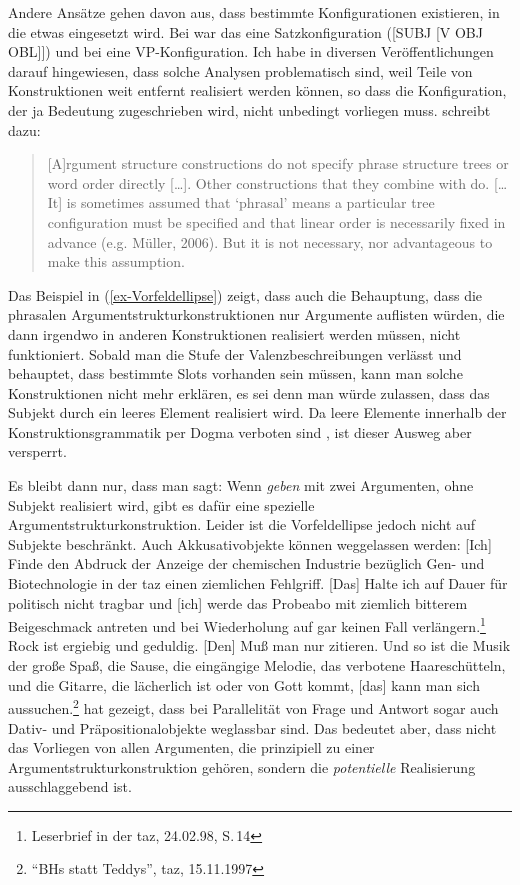Andere Ansätze gehen davon aus, dass bestimmte Konfigurationen existieren, in die etwas eingesetzt
wird. Bei \citet[192]{Goldberg95a} war das eine Satzkonfiguration ([SUBJ [V OBJ OBL]]) und bei \citet[534]{GJ2004a} eine
VP-Konfiguration. Ich habe in diversen Veröffentlichungen darauf hingewiesen, dass solche Analysen
problematisch sind, weil Teile von Konstruktionen weit entfernt realisiert werden können, so dass
die Konfiguration, der ja Bedeutung zugeschrieben wird, nicht unbedingt vorliegen muss. \citet[453]{Goldberg2013a}
schreibt dazu:
\begin{quote}
[A]rgument structure constructions do not specify phrase structure trees or word order
directly [\ldots]. Other constructions that they combine with do. [\ldots{} It] is sometimes assumed that
`phrasal' means a particular tree configuration must be specified and that linear order is
necessarily fixed in advance (e.g. Müller, 2006). But it is not necessary, nor advantageous to make this
assumption. \citep[453]{Goldberg2013a}
\end{quote}
Das Beispiel in (\ref{ex-Vorfeldellipse}) zeigt, dass auch die Behauptung, dass die phrasalen
Argumentstrukturkonstruktionen nur Argumente auflisten würden, die dann irgendwo
in anderen Konstruktionen realisiert werden müssen, nicht funktioniert. Sobald man die Stufe der
Valenzbeschreibungen verlässt und behauptet, dass bestimmte Slots vorhanden sein müssen, kann man
solche Konstruktionen nicht mehr erklären, es sei denn man würde zulassen, dass das Subjekt durch
ein leeres Element realisiert wird. Da leere Elemente innerhalb der Konstruktionsgrammatik per Dogma
verboten sind \citep[]{Goldberg2003b}, ist dieser Ausweg aber versperrt.

Es bleibt dann nur, dass man sagt: Wenn \emph{geben} mit zwei Argumenten, \dash ohne Subjekt
realisiert wird, gibt es dafür eine spezielle Argumentstrukturkonstruktion. Leider ist die
Vorfeldellipse jedoch nicht auf Subjekte beschränkt. Auch Akkusativobjekte können weggelassen werden:
\eal
\ex {}[Ich] Finde den Abdruck der Anzeige der chemischen Industrie bezüglich Gen- und Biotechnologie 
      in der taz einen ziemlichen Fehlgriff. [Das] Halte ich auf Dauer für politisch nicht tragbar 
      und [ich] werde das Probeabo mit ziemlich bitterem Beigeschmack antreten und bei Wiederholung 
      auf gar keinen Fall verlängern.\footnote{
        Leserbrief in der taz, 24.02.98, S.\,14
      }
\ex\label{rock-muss-man-zitieren}
Rock ist ergiebig und geduldig. [Den] Muß man nur zitieren. Und so ist die Musik der
      große Spaß, die Sause, die eingängige Melodie, das verbotene Haareschütteln, und die
      Gitarre, die lächerlich ist oder von Gott kommt, [das] kann man sich aussuchen.\footnote{
        "`BHs statt Teddys"', taz, 15.11.1997
      }
\zl
\citet[30, 42]{Fries88b} hat gezeigt, dass bei Parallelität von Frage und Antwort sogar auch Dativ- und
Präpositionalobjekte weglassbar sind. Das bedeutet aber, dass nicht das Vorliegen von allen
Argumenten, die prinzipiell zu einer Argumentstrukturkonstruktion gehören, sondern die \emph{potentielle}
Realisierung ausschlaggebend ist. 

